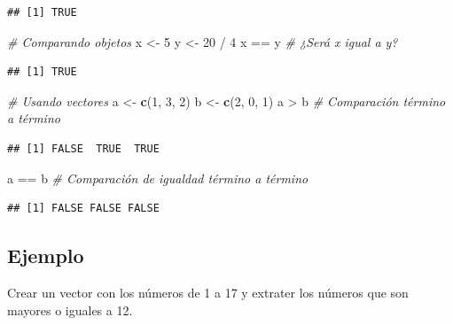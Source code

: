 \documentclass[10pt,]{krantz}
\makeatletter
\newenvironment{Shaded}{\begin{snugshade}}{\end{snugshade}}
\newcommand{\KeywordTok}[1]{\textcolor[rgb]{0.13,0.29,0.53}{\textbf{{#1}}}}
\newcommand{\DecValTok}[1]{\textcolor[rgb]{0.00,0.00,0.81}{{#1}}}
\newcommand{\StringTok}[1]{\textcolor[rgb]{0.31,0.60,0.02}{{#1}}}
\newcommand{\CommentTok}[1]{\textcolor[rgb]{0.56,0.35,0.01}{\textit{{#1}}}}
\newcommand{\NormalTok}[1]{{#1}}
\newenvironment{kframe}{%
\medskip{}
\setlength{\fboxsep}{.8em}
 \def\at@end@of@kframe{}%
 \ifinner\ifhmode%
  \def\at@end@of@kframe{\end{minipage}}%
  \begin{minipage}{\columnwidth}%
 \fi\fi%
 \def\FrameCommand##1{\hskip\@totalleftmargin \hskip-\fboxsep
 \colorbox{shadecolor}{##1}\hskip-\fboxsep
     \hskip-\linewidth \hskip-\@totalleftmargin \hskip\columnwidth}%
 \MakeFramed {\advance\hsize-\width
   \@totalleftmargin\z@ \linewidth\hsize
   \@setminipage}}%
 {\par\unskip\endMakeFramed%
 \at@end@of@kframe}
\renewenvironment{Shaded}{\begin{kframe}}{\end{kframe}}
\makeatother
\begin{document}
\begin{verbatim}
## [1] TRUE
\end{verbatim}

\begin{Shaded}
\begin{Highlighting}[]
\CommentTok{# Comparando objetos}
\NormalTok{x <-}\StringTok{ }\DecValTok{5}
\NormalTok{y <-}\StringTok{ }\DecValTok{20} \NormalTok{/}\StringTok{ }\DecValTok{4}
\NormalTok{x ==}\StringTok{ }\NormalTok{y  }\CommentTok{# ¿Será x igual a y?}
\end{Highlighting}
\end{Shaded}

\begin{verbatim}
## [1] TRUE
\end{verbatim}

\begin{Shaded}
\begin{Highlighting}[]
\CommentTok{# Usando vectores}
\NormalTok{a <-}\StringTok{ }\KeywordTok{c}\NormalTok{(}\DecValTok{1}\NormalTok{, }\DecValTok{3}\NormalTok{, }\DecValTok{2}\NormalTok{)}
\NormalTok{b <-}\StringTok{ }\KeywordTok{c}\NormalTok{(}\DecValTok{2}\NormalTok{, }\DecValTok{0}\NormalTok{, }\DecValTok{1}\NormalTok{)}
\NormalTok{a >}\StringTok{ }\NormalTok{b  }\CommentTok{# Comparación término a término}
\end{Highlighting}
\end{Shaded}

\begin{verbatim}
## [1] FALSE  TRUE  TRUE
\end{verbatim}

\begin{Shaded}
\begin{Highlighting}[]
\NormalTok{a ==}\StringTok{ }\NormalTok{b  }\CommentTok{# Comparación de igualdad término a término}
\end{Highlighting}
\end{Shaded}

\begin{verbatim}
## [1] FALSE FALSE FALSE
\end{verbatim}

\subsection*{Ejemplo}\label{ejemplo-6}


Crear un vector con los números de 1 a 17 y extrater los números que son
mayores o iguales a 12.
\end{document}
